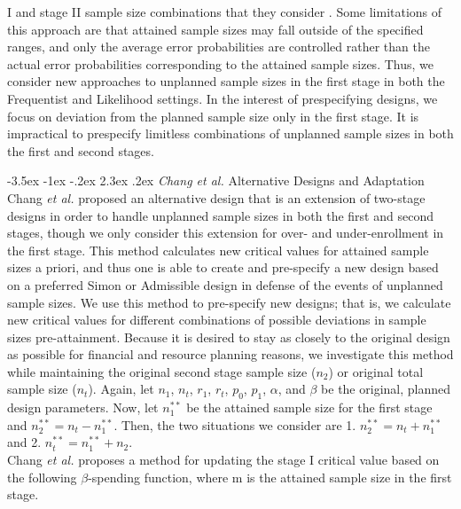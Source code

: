 \documentclass[12pt]{report}\usepackage[]{graphicx}\usepackage[]{color}
\makeatletter
\newlength{\li}\setlength{\li}{14.48pt}
\newlength{\di}\setlength{\di}{-3.5mm}
\renewcommand\section{ \@startsection {section}{1}{\z@}%
                                   {-3.5ex \@plus -1ex \@minus -.2ex}%
                                   {2.3ex \@plus.2ex}%
                                   {\centering\large\fontfamily{qcs}\selectfont}}
\makeatother
\begin{document}
I and stage II sample size combinations that they consider \cite{Chen}. Some limitations of this approach are that attained sample sizes may fall outside of the specified ranges, and only the average error probabilities are controlled rather than the actual error probabilities corresponding to the attained sample sizes. Thus, we consider new approaches to unplanned sample sizes in the first stage in both the Frequentist and Likelihood settings. In the interest of prespecifying designs, we focus on deviation from the planned sample size only in the first stage. It is impractical to prespecify limitless combinations of unplanned sample sizes in both the first and second stages.   

\section{\textit{Chang et al.} Alternative Designs and Adaptation}
Chang \textit{et al.} \cite{Chang} proposed an alternative design that is an extension of two-stage designs in order to handle unplanned sample sizes in both the first and second stages, though we only consider this extension for over- and under-enrollment in the first stage. This method calculates new critical values for attained sample sizes a priori, and thus one is able to create and pre-specify a new design based on a preferred Simon or Admissible design in defense of the events of unplanned sample sizes. We use this method to pre-specify new designs; that is, we calculate new critical values for different combinations of possible deviations in sample sizes pre-attainment. Because it is desired to stay as closely to the original design as possible for financial and resource planning reasons, we investigate this method while maintaining the original second stage sample size ($n_2$) or original total sample size ($n_t$). Again, let $n_1$, $n_t$, $r_1$, $r_t$, $p_0$, $p_1$, $\alpha$, and $\beta$ be the original, planned design parameters. Now, let $n_1^{\ast \ast}$ be the attained sample size for the first stage and $n_2^{\ast\ast} = n_t - n_1^{\ast\ast}$. Then, the two situations we consider are 1. $n_2^{\ast\ast} = n_t + n_1^{\ast\ast}$ and 2. $n_t^{\ast\ast} = n_1^{\ast\ast} + n_2$. \\
\indent Chang \textit{et al.} proposes a method for updating the stage I critical value based on the following $\beta$-spending function, where m is the attained sample size in the first stage.
\end{document}
